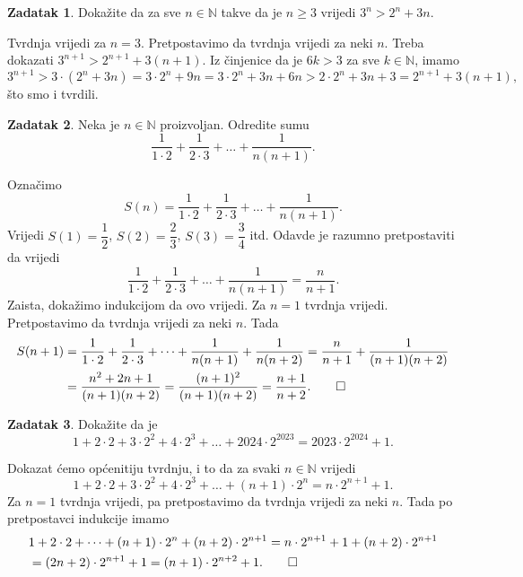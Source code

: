 \documentclass{book}
\renewenvironment{proof}{%
    \vspace{-\parskip}\begin{oldproof}%
    }{%
    \end{oldproof}%
}
\theoremstyle{definition}
\theoremstyle{definition}
\newtheorem{exercise}{Zadatak}
\theoremstyle{remark}
\begin{document}
\begin{exercise}
Dokažite da za sve $n\in \mathbb{N}$ takve da je $n\geq 3$ vrijedi $3^n>2^n+3n$.
\end{exercise}
\begin{proof}[Rješenje]
Tvrdnja vrijedi za $n=3$. Pretpostavimo da tvrdnja vrijedi za neki $n$. Treba dokazati $3^{n+1}>2^{n+1}+3(n+1)$. Iz činjenice da je $6k>3$ za sve $k\in \mathbb{N}$, imamo
$$3^{n+1}>3\cdot (2^n+3n)=3\cdot 2^n+9n=3\cdot 2^n+3n+6n>2\cdot 2^n+3n+3=2^{n+1}+3(n+1),$$
što smo i tvrdili.
\end{proof}
\begin{exercise}
Neka je $n\in \mathbb{N}$ proizvoljan. Odredite sumu
$$\dfrac{1}{1\cdot 2}+\dfrac{1}{2\cdot 3}+\dots+\dfrac{1}{n(n+1)}.$$
\end{exercise}
\begin{proof}[Rješenje]
Označimo
$$S(n)=\dfrac{1}{1\cdot 2}+\dfrac{1}{2\cdot 3}+\dots+\dfrac{1}{n(n+1)}.$$
Vrijedi $S(1)=\dfrac{1}{2}$, $S(2)=\dfrac{2}{3}$, $S(3)=\dfrac{3}{4}$ itd. Odavde je razumno pretpostaviti da vrijedi
$$\dfrac{1}{1\cdot 2}+\dfrac{1}{2\cdot 3}+\dots+\dfrac{1}{n(n+1)}=\dfrac{n}{n+1}.$$
Zaista, dokažimo indukcijom da ovo vrijedi. Za $n=1$ tvrdnja vrijedi. Pretpostavimo da tvrdnja vrijedi za neki $n$. Tada
\begin{align*}
S(n+1)&=\dfrac{1}{1\cdot 2}+\dfrac{1}{2\cdot 3}+\dots+\dfrac{1}{n(n+1)}+\dfrac{1}{n(n+2)}=\dfrac{n}{n+1}+\dfrac{1}{(n+1)(n+2)}\\
&=\dfrac{n^2+2n+1}{(n+1)(n+2)}=\dfrac{(n+1)^2}{(n+1)(n+2)}=\dfrac{n+1}{n+2}.
\qedhere
\end{align*}
\end{proof}
\begin{exercise}
Dokažite da je
$$1+2\cdot 2+3\cdot 2^2+4\cdot 2^3+\dots+2024\cdot 2^{2023}=2023\cdot 2^{2024}+1.$$
\end{exercise}
\begin{proof}[Rješenje]
Dokazat ćemo općenitiju tvrdnju, i to da za svaki $n\in \mathbb{N}$ vrijedi
$$1+2\cdot 2+3\cdot 2^2+4\cdot 2^3+\dots+(n+1)\cdot 2^{n}=n\cdot 2^{n+1}+1.$$
Za $n=1$ tvrdnja vrijedi, pa pretpostavimo da tvrdnja vrijedi za neki $n$. Tada po pretpostavci indukcije imamo
\begin{align*}
&1+2\cdot 2+\dots+(n+1)\cdot 2^{n}+(n+2)\cdot 2^{n+1}=n\cdot 2^{n+1}+1+(n+2)\cdot 2^{n+1}\\
&=(2n+2)\cdot 2^{n+1}+1=(n+1)\cdot 2^{n+2}+1.\qedhere
\end{align*}
\end{proof}
\newpage
\end{document}
